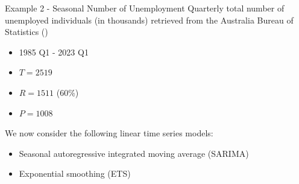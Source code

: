 \begin{frame}{Example 2 - Seasonal Number of Unemployment}
    Quarterly total number of unemployed individuals (in thousands) retrieved from the Australia Bureau of Statistics (\cite{ABS})

    \begin{itemize}
    \item 1985 Q1 - 2023 Q1
    \item $T = 2519$
    \item $R = 1511$ (60\%)
    \item $P = 1008$
    \end{itemize}

    \vspace{5mm}
    
    We now consider the following linear time series models: 
    
    \begin{itemize}
    \item Seasonal autoregressive integrated moving average (SARIMA)
    \item Exponential smoothing (ETS)
    \end{itemize}
\end{frame}




